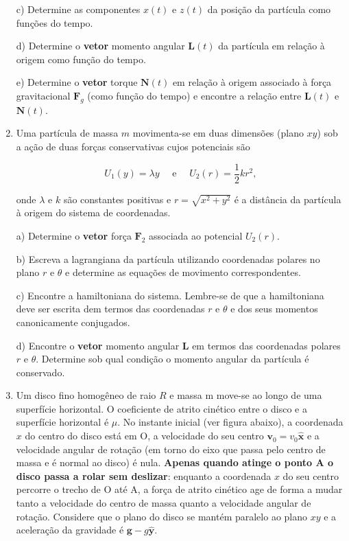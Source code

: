 \begin{enumerate}[start=1,label={\bfseries Q\arabic*.}]
\resposta

c) Determine as componentes $x(t)$ e $z(t)$ da posição da partícula como funções do tempo.

\resposta

d) Determine o \textbf{vetor} momento angular $\mathbf{L}(t)$ da partícula em relação à origem como função do tempo.

\resposta

e) Determine o \textbf{vetor} torque $\mathbf{N}(t)$ em relação à origem associado à força gravitacional $\mathbf{F}_{g}$ (como função do tempo) e encontre a relação entre $\mathbf{L}(t)$ e $\mathbf{N}(t)$.

\resposta




\item Uma partícula de massa $m$ movimenta-se em duas dimensões (plano $xy$) sob a ação de duas forças conservativas cujos potenciais são

$$
U_{1}(y) = \lambda y \quad  \mbox{ e } \quad U_{2}(r) = \frac{1}{2} kr^{2},
$$

onde $\lambda$ e $k$ são constantes positivas e $r = \sqrt{x^{2} + y^{2}}$ é a distância da partícula à origem do sistema de coordenadas.


a) Determine o \textbf{vetor} força $\mathbf{F}_{2}$ associada ao potencial $U_{2}(r)$.

\resposta

b) Escreva a lagrangiana da partícula utilizando coordenadas polares no plano $r$ e $\theta$ e determine as equações de movimento correspondentes.

\resposta

c) Encontre a hamiltoniana do sistema. Lembre-se de que a hamiltoniana deve ser escrita dem termos das coordenadas $r$ e $\theta$ e dos seus momentos canonicamente conjugados.

\resposta

d) Encontre o \textbf{vetor} momento angular $\mathbf{L}$ em termos das coordenadas polares $r$ e $\theta$. Determine sob qual condição o momento angular da partícula é conservado.

\resposta




\item Um disco fino homogêneo de raio $R$ e massa m move-se ao longo de uma superfície horizontal. O coeficiente de atrito cinético entre o disco e a superfície horizontal é $\mu$. No instante inicial (ver figura abaixo), a coordenada $x$ do centro do disco está em O, a velocidade do seu centro
$\mathbf{v}_{0} = v_{0}\hat{\mathbf{x}}$ e a velocidade angular de rotação (em torno do eixo que passa pelo centro de massa e é normal ao disco) é nula. \textbf{Apenas quando atinge o ponto A o disco passa a rolar sem deslizar}: enquanto a coordenada $x$ do seu centro percorre o trecho de O até A, a
força de atrito cinético age de forma a mudar tanto a velocidade do centro de massa quanto a velocidade angular de rotação. Considere que o plano do disco se mantém paralelo ao plano $xy$ e a aceleração da gravidade é $\mathbf{g} -g\hat{\mathbf{y}}$.


\end{enumerate}
